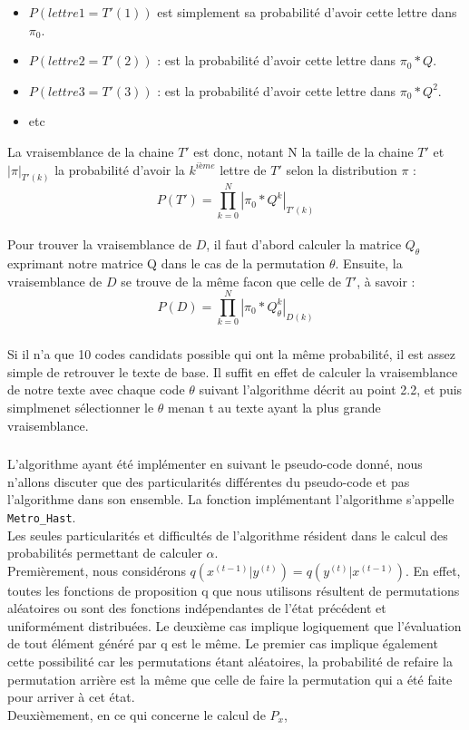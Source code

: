 \documentclass[11pt]{report}
\begin{document}
\begin{itemize}
\item $P(lettre 1 = T'(1))$ est simplement sa probabilité d'avoir cette lettre dans $\pi_{0}$.
\item $P(lettre 2 = T'(2))$ : est la probabilité d'avoir cette lettre dans $\pi_{0}*Q$.
\item $P(lettre 3 = T'(3))$ : est la probabilité d'avoir cette lettre dans $\pi_{0}*Q^{2}$.
\item etc
\end{itemize}

La vraisemblance de la chaine $T'$ est donc, notant N la taille de la chaine $T'$ et $| \pi|_{T'(k)}$ la probabilité d'avoir la $k^{ième}$ lettre de $T'$ selon la distribution $\pi$ :
$$P(T') = \prod_{k=0}^{N} |\pi_{0}*Q^{k}|_{T'(k)}$$

\paragraph{}
Pour trouver la vraisemblance de $D$, il faut d'abord calculer la matrice $Q_{\theta}$ exprimant notre matrice Q dans le cas  de la permutation $\theta$. Ensuite, la vraisemblance de $D$ se trouve de la même facon que celle de $T'$, à savoir : 
$$P(D) = \prod_{k=0}^{N} |\pi_{0}*Q_{\theta}^{k}|_{D(k)}$$

\subsubsection{}

Si il n'a que 10 codes candidats possible qui ont la même probabilité, il est assez simple de retrouver le texte de base. Il suffit en effet de calculer la vraisemblance de notre texte avec chaque code $\theta$ suivant l'algorithme décrit au point 2.2, et puis simplmenet sélectionner le $\theta$ menan	t au texte ayant la plus grande vraisemblance.
\subsubsection{}
L'algorithme ayant été implémenter en suivant le pseudo-code donné, nous n'allons discuter que des particularités différentes du pseudo-code et pas l'algorithme dans son ensemble. La fonction implémentant l'algorithme s'appelle \texttt{Metro\_Hast}. \\
Les seules particularités et difficultés de l'algorithme résident dans le calcul des probabilités permettant de calculer $\alpha$.\\
Premièrement, nous considérons $q(x^{(t-1)}|y^{(t)}) = q(y^{(t)}|x^{(t-1)})$. En effet, toutes les fonctions de proposition q que nous utilisons résultent de permutations aléatoires ou sont des fonctions indépendantes de l'état précédent et uniformément distribuées. Le deuxième cas implique logiquement que l'évaluation de tout élément généré par q est le même. Le premier cas implique également cette possibilité car les permutations étant aléatoires, la probabilité de refaire la permutation arrière est la même que celle de faire la permutation qui a été faite pour arriver à cet état.\\
Deuxièmement, en ce qui concerne le calcul de $P_x$,
\end{document}
